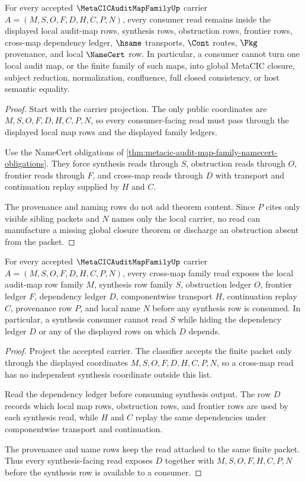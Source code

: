 \begin{theorem}
\label{thm:metacic-audit-map-family-nonescape}
For every accepted $\MetaCICAuditMapFamilyUp$ carrier $A=(M,S,O,F,D,H,C,P,N)$, every consumer read remains inside the displayed local audit-map rows, synthesis rows, obstruction rows, frontier rows, cross-map dependency ledger, $\hsame$ transports, $\Cont$ routes, $\Pkg$ provenance, and local $\NameCert$ row. In particular, a consumer cannot turn one local audit map, or the finite family of such maps, into global MetaCIC closure, subject reduction, normalization, confluence, full closed consistency, or host semantic equality.
\end{theorem}
\begin{proof}
Start with the carrier projection. The only public coordinates are $M,S,O,F,D,H,C,P,N$, so every consumer-facing read must pass through the displayed local map rows and the displayed family ledgers.

Use the NameCert obligations of \autoref{thm:metacic-audit-map-family-namecert-obligations}. They force synthesis reads through $S$, obstruction reads through $O$, frontier reads through $F$, and cross-map reads through $D$ with transport and continuation replay supplied by $H$ and $C$.

The provenance and naming rows do not add theorem content. Since $P$ cites only visible sibling packets and $N$ names only the local carrier, no read can manufacture a missing global closure theorem or discharge an obstruction absent from the packet.
\end{proof}

\begin{theorem}
\label{thm:metacic-audit-map-family-dependency-readback}
For every accepted $\MetaCICAuditMapFamilyUp$ carrier $A=(M,S,O,F,D,H,C,P,N)$, every cross-map family read exposes the local audit-map row family $M$, synthesis row family $S$, obstruction ledger $O$, frontier ledger $F$, dependency ledger $D$, componentwise transport $H$, continuation replay $C$, provenance row $P$, and local name $N$ before any synthesis row is consumed. In particular, a synthesis consumer cannot read $S$ while hiding the dependency ledger $D$ or any of the displayed rows on which $D$ depends.
\end{theorem}
\begin{proof}
Project the accepted carrier. The classifier accepts the finite packet only through the displayed coordinates $M,S,O,F,D,H,C,P,N$, so a cross-map read has no independent synthesis coordinate outside this list.

Read the dependency ledger before consuming synthesis output. The row $D$ records which local map rows, obstruction rows, and frontier rows are used by each synthesis read, while $H$ and $C$ replay the same dependencies under componentwise transport and continuation.

The provenance and name rows keep the read attached to the same finite packet. Thus every synthesis-facing read exposes $D$ together with $M,S,O,F,H,C,P,N$ before the synthesis row is available to a consumer.
\end{proof}

